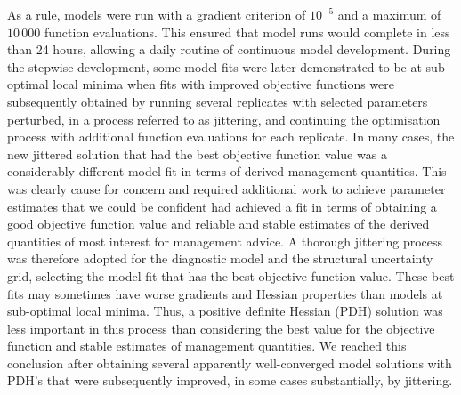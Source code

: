 As a rule, models were run with a gradient criterion of $10^{-5}$ and a maximum of $10\,000$ function evaluations. This ensured that model runs would complete in less than 24 hours, allowing a daily routine of continuous model development. During the stepwise development, some model fits were later demonstrated to be at sub-optimal local minima when fits with improved objective functions were subsequently obtained by running several replicates with selected parameters perturbed, in a process referred to as jittering, and  continuing the optimisation process with additional function evaluations for each replicate. In many cases, the new jittered solution that had the best objective function value was a considerably different model fit in terms of derived management quantities. This was clearly cause for concern and required additional work to achieve parameter estimates that we could be confident had achieved a fit in terms of obtaining a good objective function value and reliable and stable estimates of the derived quantities of most interest for management advice. A thorough jittering process was therefore adopted for the diagnostic model and the structural uncertainty grid, selecting the model fit that has the best objective function value. These best fits may sometimes have worse gradients and Hessian properties than models at sub-optimal local minima. Thus, a positive definite Hessian (PDH) solution was less important in this process than considering the best value for the objective function and stable estimates of management quantities. We reached this conclusion after obtaining several apparently well-converged model solutions with PDH's that were subsequently improved, in some cases substantially, by jittering.

